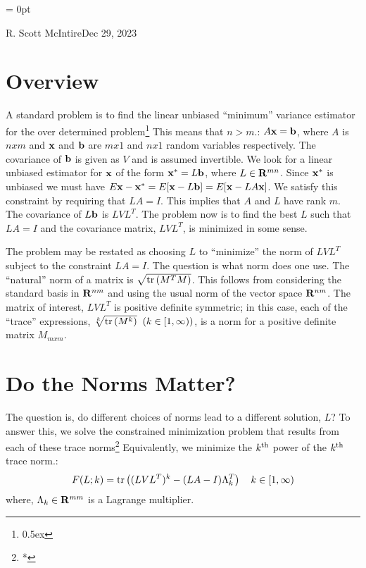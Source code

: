 

\parindent = 0pt

{R. Scott McIntire}{Dec 29, 2023}

\parskip=8pt


\section{Overview}
A standard problem is to find the linear unbiased ``minimum'' variance estimator
for the over determined problem\footnote{\kern 0.5pt \raise 0.5ex \hbox{\dag}}
{This means that $n > m$.}: $A {\bf x} = {\bf b}$, where 
$A$ is $nxm$ and ${\bf x}$ and
${\bf b}$ are $mx1$ and $nx1$ random variables respectively. The
covariance of ${\bf b}$ is given as $V$ and is assumed invertible. 
We look for a linear unbiased estimator for ${\bf x}$ of the form 
${\bf x}^* = L {\bf b}$, where $L\in {\bf R}^{mn}$. Since ${\bf x}^*$
is unbiased we must have 
$E{{\bf x} - {\bf x}^*} = E[{\bf x} - L
  {\bf b}] = E[{\bf x} - LA{\bf x}]$. We satisfy this constraint by
requiring that $LA = I$. This implies that $A$ and $L$ have rank $m$.
The covariance of $L{\bf b}$ is $LVL^T$. The problem now is to find
the best $L$ such that $LA = I$ and the covariance matrix, $LVL^T$, is
minimized in some sense.

The problem may be restated as choosing $L$ to ``minimize'' the norm of $LVL^T$
subject to the constraint $LA = I$. The question is what norm does one
use. The ``natural'' norm of a matrix is $\sqrt{{\rm
    tr}\left(M^TM\right)}$. This 
    follows from considering the standard basis in ${\bf R}^{nm}$ and
    using the usual norm of the vector space ${\bf R}^{nm}$. 
The matrix of interest, $LVL^T$ is positive definite
    symmetric; in this case, each of the ``trace'' 
expressions, $\root k \of {{\rm
          tr}\left(M^k\right)} \;\; (k \in [1,\infty ))$, is a norm for a 
positive definite matrix $M_{mxm}$.

\section{Do the Norms Matter?}
The question is, do different choices of norms lead to a different
solution, $L$? To answer this, we solve the constrained minimization 
problem that results from each of these trace norms\footnote{\kern 0.5pt *}
{Equivalently, we minimize the $k^{\rm th}$ power
of the $k^{\rm th}$ trace norm.}:
$$
F(L; k) = {\rm tr}\left((LVL^T)^k - (LA - I)\Lambda_{k}^T\right) 
\quad k \in [1,\infty)
$$
where, $\Lambda_k \in {\bf R}^{mm}$ is a Lagrange multiplier.

